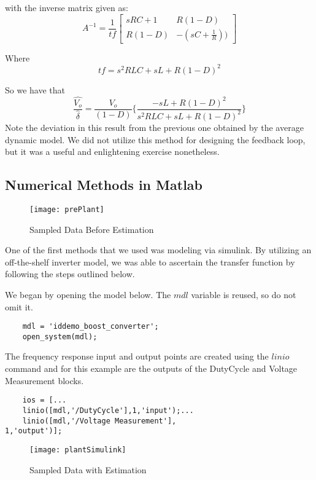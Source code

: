 with the inverse matrix given as:
\begin{equation}
A^{-1} = \frac{1}{tf}\begin{bmatrix}
sRC + 1 & R(1-D) \\ 
R(1-D) & -(sC+\frac{1}{R})) 
\end{bmatrix}
\end{equation}

Where
\begin{equation}
tf = s^2RLC + sL + R(1-D)^2
\end{equation}

So we have that 
\begin{equation}
\frac{\hat{V_o}}{\hat{\delta}} = \frac{V_o}{(1-D)} \bigg\{\frac{-sL + R(1-D)^2}{s^2RLC + sL + R(1-D)^2}\bigg\}
\end{equation}
Note the deviation in this result from the previous one obtained by the average dynamic model. We did not utilize this method for designing the feedback loop, but it was a useful and enlightening exercise nonetheless.

\subsection{Numerical Methods in Matlab}

\begin{figure}[htbp]
\begin{center}
\texttt{[image: prePlant]}
\caption{Sampled Data Before Estimation}
\label{prePlant}
\end{center}
\end{figure}
One of the first methods that we used was modeling via simulink. By utilizing an off-the-shelf inverter model, we was able to ascertain the transfer function by following the steps outlined below. 

We began by opening the model below. The $mdl$ variable is reused, so do not omit it.
\begin{verbatim}
	mdl = 'iddemo_boost_converter';
	open_system(mdl);
\end{verbatim}
The frequency response input and output points are created using the $linio$ command and for this example are the outputs of the DutyCycle and Voltage Measurement blocks.
\begin{verbatim}
	ios = [...
	linio([mdl,'/DutyCycle'],1,'input');...
	linio([mdl,'/Voltage Measurement'],
1,'output')];
\end{verbatim}

\begin{figure}[htbp]
\begin{center}
\texttt{[image: plantSimulink]}
\caption{Sampled Data with Estimation}
\label{plantSimulink}
\end{center}
\end{figure}

